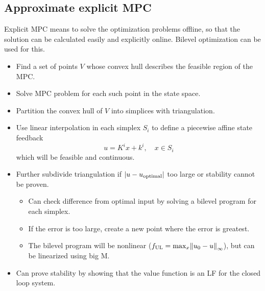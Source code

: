 \subsection{Approximate explicit MPC}
Explicit MPC means to solve the optimization problems offline, so that the solution can be calculated easily and explicitly online. Bilevel optimization can be used for this.
%
\begin{itemize}
  \item Find a set of points $V$ whose convex hull describes the feasible region of the MPC.
  \item Solve MPC problem for each such point in the state space.
  \item Partition the convex hull of $V$ into simplices with triangulation.
  \item Use linear interpolation in each simplex $S_i$ to define a piecewise affine state feedback
  \begin{equation}
    u = K^i x + k^i,\quad x \in S_i
  \end{equation}
  which will be feasible and continuous.
  \item Further subdivide triangulation if $|u-u_\mathrm{optimal}|$ too large or stability cannot be proven.
  \begin{itemize}
    \item Can check difference from optimal input by solving a bilevel program for each simplex.
    \item If the error is too large, create a new point where the error is greatest.
    \item The bilevel program will be nonlinear ($f_\mathrm{UL} = \max_x \norm{u_0 - u}_\infty$), but can be linearized using big M.
  \end{itemize}
  \item Can prove stability by showing that the value function is an LF for the closed loop system.
\end{itemize}
